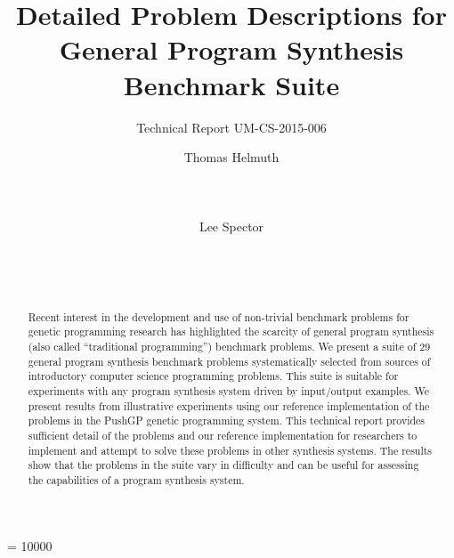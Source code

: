 \documentclass{sig-alternate}
\begin{document}
%


\widowpenalty = 10000

\title{Detailed Problem Descriptions for General Program Synthesis Benchmark Suite}

\subtitle{Technical Report UM-CS-2015-006}


\author{
\alignauthor
Thomas Helmuth\\
       \\
       \\
       \\
\alignauthor
Lee Spector\\
       \\
       \\
       \\
}

\maketitle

\begin{abstract}
Recent interest in the development and use of non-trivial benchmark problems for genetic programming research has highlighted the scarcity of general program synthesis (also called ``traditional programming'') benchmark problems. We present a suite of $29$ general program synthesis benchmark problems systematically selected from sources of introductory computer science programming problems. This suite is suitable for experiments with any program synthesis system driven by input/output examples. We present results from illustrative experiments using our reference implementation of the problems in the PushGP genetic programming system. This technical report provides sufficient detail of the problems and our reference implementation for researchers to implement and attempt to solve these problems in other synthesis systems. The results show that the problems in the suite vary in difficulty and can be useful for assessing the capabilities of a program synthesis system.
\end{abstract}
\end{document}
